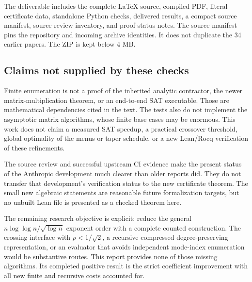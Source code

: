 The deliverable includes the complete LaTeX source, compiled PDF, literal
certificate data, standalone Python checks, delivered results, a compact
source manifest, source-review inventory, and proof-status notes. The
source manifest pins the repository and incoming archive identities.
It does not duplicate the 34 earlier papers. The ZIP is kept below 4 MB.

\subsection{Claims not supplied by these checks}

Finite enumeration is not a proof of the inherited analytic contractor,
the newer matrix-multiplication theorem, or an end-to-end SAT executable.
Those are mathematical dependencies cited in the text. The tests also do
not implement the asymptotic matrix algorithms, whose finite base cases
may be enormous. This work does not claim a measured SAT speedup, a
practical crossover threshold, global optimality of the menus or taper
schedule, or a new Lean/Rocq verification of these refinements.

The source review and successful upstream CI evidence make the present
status of the Anthropic development much clearer than older reports did.
They do not transfer that development's verification status to the new
certificate theorem. The small new algebraic statements are reasonable
future formalization targets, but no unbuilt Lean file is presented as a
checked theorem here.

The remaining research objective is explicit: reduce the general
$n\log\log n/\sqrt{\log n}$ exponent order with a complete counted
construction. The crossing interface with $\rho<1/\sqrt2$, a recursive
compressed degree-preserving representation, or an evaluator that avoids
independent mode-index enumeration would be substantive routes. This
report provides none of those missing algorithms. Its completed
positive result is the strict coefficient improvement with all new
finite and recursive costs accounted for.
